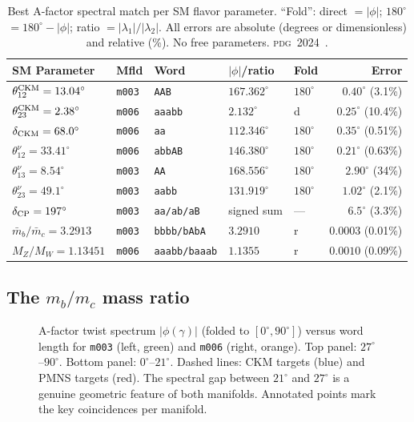 \documentclass[11pt,a4paper]{article}
\newcommand{\mfld}[1]{\texttt{#1}}
\newcommand{\word}[1]{\texttt{#1}}
\newcommand{\degr}{^{\circ}}
\newcommand{\PDG}{\textsc{pdg}}
\begin{document}
\begin{table}[htbp]
\centering
\caption{Best A-factor spectral match per SM flavor parameter.
  ``Fold'': direct $=|\phi|$; $180\degr$$=180\degr-|\phi|$; ratio $=|\lambda_1|/|\lambda_2|$.
  All errors are absolute (degrees or dimensionless) and relative (\%).
  No free parameters. \PDG\ 2024~\cite{PDG2024}.}
\label{tab:headline}
\small
\begin{tabular}{@{}lllp{1.5cm}lr@{}}
\toprule
SM Parameter & Mfld & Word & $|\phi|$/ratio & Fold & Error \\
\midrule
$\theta_{12}^{\rm CKM}=13.04\degr$ & \mfld{m003} & \word{AAB} & $167.362\degr$ & $180\degr$ & $0.40\degr$ (3.1\%) \\
$\theta_{23}^{\rm CKM}=2.38\degr$ & \mfld{m006} & \word{aaabb} & $2.132\degr$ & d & $0.25\degr$ (10.4\%) \\
$\delta_{\rm CKM}=68.0\degr$ & \mfld{m006} & \word{aa} & $112.346\degr$ & $180\degr$ & $0.35\degr$ (0.51\%) \\
$\theta_{12}^\nu=33.41\degr$ & \mfld{m006} & \word{abbAB} & $146.380\degr$ & $180\degr$ & $0.21\degr$ (0.63\%) \\
$\theta_{13}^\nu=8.54\degr$ & \mfld{m003} & \word{AA} & $168.556\degr$ & $180\degr$ & $2.90\degr$ (34\%) \\
$\theta_{23}^\nu=49.1\degr$ & \mfld{m003} & \word{aabb} & $131.919\degr$ & $180\degr$ & $1.02\degr$ (2.1\%) \\
$\delta_{\rm CP}=197\degr$ & \mfld{m003} & \word{aa/ab/aB} & signed sum & --- & $6.5\degr$ (3.3\%) \\
$\bar{m}_b/\bar{m}_c=3.2913$ & \mfld{m003} & \word{bbbb/bAbA} & $3.2910$ & r & $0.0003$ (0.01\%) \\
$M_Z/M_W=1.13451$ & \mfld{m006} & \word{aaabb/baaab} & $1.1355$ & r & $0.0010$ (0.09\%) \\
\bottomrule
\end{tabular}
\end{table}

\subsection{The \texorpdfstring{$m_b/m_c$}{mb/mc} mass ratio}
\label{sec:mbmc}

\begin{figure}[htbp]
\centering
\caption{A-factor twist spectrum $|\phi(\gamma)|$ (folded to $[0\degr,90\degr]$)
  versus word length for \mfld{m003} (left, green) and \mfld{m006} (right, orange).
  Top panel: $27\degr$--$90\degr$. Bottom panel: $0\degr$--$21\degr$.
  Dashed lines: CKM targets (blue) and PMNS targets (red).
  The spectral gap between $21\degr$ and $27\degr$ is a genuine geometric
  feature of both manifolds.
  Annotated points mark the key coincidences per manifold.}
\label{fig:spectrum}
\end{figure}
\end{document}
